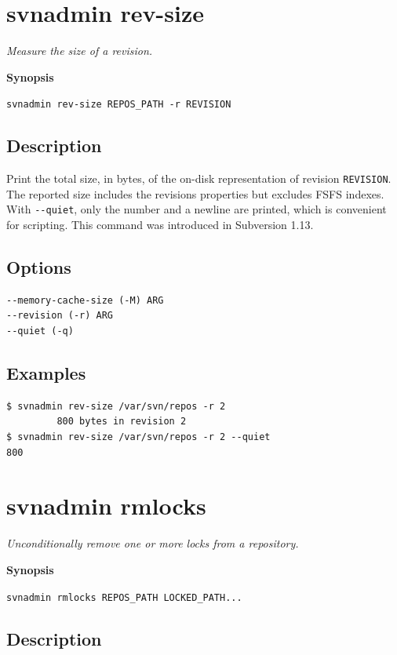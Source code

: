 \section{svnadmin rev-size}\label{svn.ref.svnadmin.c.rev-size}

\emph{Measure the size of a revision.}

\textbf{Synopsis}

\texttt{svnadmin\ rev-size\ REPOS\_PATH\ -r\ REVISION}

\subsection{Description}

Print the total size, in bytes, of the on-disk representation of revision
\texttt{REVISION}. The reported size includes the revision\textquotesingle s
properties but excludes FSFS indexes. With \texttt{-\/-quiet}, only the
number and a newline are printed, which is convenient for scripting. This
command was introduced in Subversion 1.13.

\subsection{Options}

\begin{verbatim}
--memory-cache-size (-M) ARG
--revision (-r) ARG
--quiet (-q)
\end{verbatim}

\subsection{Examples}

\begin{verbatim}
$ svnadmin rev-size /var/svn/repos -r 2
         800 bytes in revision 2
$ svnadmin rev-size /var/svn/repos -r 2 --quiet
800
\end{verbatim}

\section{svnadmin rmlocks}\label{svn.ref.svnadmin.c.rmlocks}

\emph{Unconditionally remove one or more locks from a repository.}

\textbf{Synopsis}

\texttt{svnadmin\ rmlocks\ REPOS\_PATH\ LOCKED\_PATH...}

\subsection{Description}

